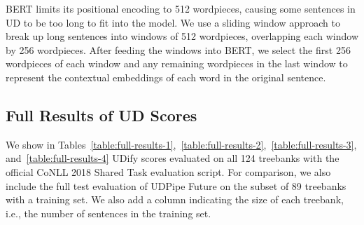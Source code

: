 \documentclass[11pt,a4paper]{article}
\begin{document}
BERT limits its positional encoding to 512 wordpieces, causing some sentences in UD to be too long to fit into the model.
We use a sliding window approach to break up long sentences into windows of 512 wordpieces, overlapping each window by 256 wordpieces.
After feeding the windows into BERT, we select the first 256 wordpieces of each window and any remaining wordpieces in the last window to represent the contextual embeddings of each word in the original sentence.









\subsection{Full Results of UD Scores} \label{sec:full-results}

We show in Tables~\ref{table:full-results-1},~\ref{table:full-results-2},~\ref{table:full-results-3}, and~\ref{table:full-results-4} UDify scores evaluated on all 124 treebanks with the official CoNLL 2018 Shared Task evaluation script.
For comparison, we also include the full test evaluation of UDPipe Future on the subset of 89 treebanks with a training set.
We also add a column indicating the size of each treebank, i.e., the number of sentences in the training set.
\end{document}
